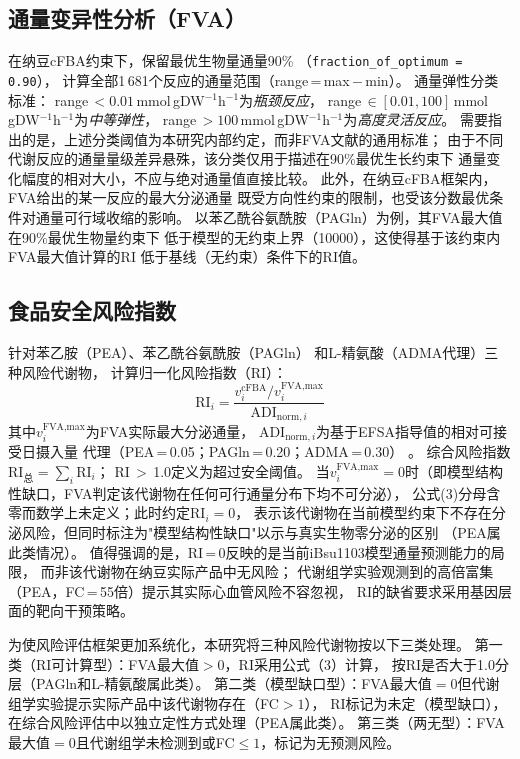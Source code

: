 \documentclass[10pt, a4paper, twocolumn]{ctexart}
\newcommand{\ibsu}{iBsu1103}
\newcommand{\cfba}{cFBA}
\newcommand{\mmolg}{mmol\,gDW$^{-1}$h$^{-1}$}
\begin{document}
\subsection{通量变异性分析（FVA）}

在纳豆\cfba{}约束下，保留最优生物量通量90\%
（\texttt{fraction\_of\_optimum\,=\,0.90}）\citep{Gudmundsson2010}，
计算全部1\,681个反应的通量范围（range\,=\,max\,$-$\,min）。
通量弹性分类标准：
range\,$<0.01$\,\mmolg{}为\emph{瓶颈反应}，
range\,$\in[0.01, 100]$\,\mmolg{}为\emph{中等弹性}，
range\,$>100$\,\mmolg{}为\emph{高度灵活反应}。
需要指出的是，上述分类阈值为本研究内部约定，而非FVA文献的通用标准；
由于不同代谢反应的通量量级差异悬殊，该分类仅用于描述在90\%最优生长约束下
通量变化幅度的相对大小，不应与绝对通量值直接比较。
此外，在纳豆\cfba{}框架内，FVA给出的某一反应的最大分泌通量
既受方向性约束的限制，也受该分数最优条件对通量可行域收缩的影响。
以苯乙酰谷氨酰胺（PAGln）为例，其FVA最大值在90\%最优生物量约束下
低于模型的无约束上界（10000），这使得基于该约束内FVA最大值计算的RI
低于基线（无约束）条件下的RI值。

\subsection{食品安全风险指数}

针对苯乙胺（PEA）、苯乙酰谷氨酰胺（PAGln）
和L-精氨酸（ADMA代理）三种风险代谢物，
计算归一化风险指数（RI）：
\begin{equation}
  \mathrm{RI}_i =
  \frac{v_i^{\text{cFBA}} / v_i^{\text{FVA,max}}}{\mathrm{ADI}_{\text{norm},i}}
\end{equation}
其中$v_i^{\text{FVA,max}}$为FVA实际最大分泌通量，
$\mathrm{ADI}_{\text{norm},i}$为基于EFSA指导值的相对可接受日摄入量
代理（PEA\,=\,0.05；PAGln\,=\,0.20；ADMA\,=\,0.30）
\citep{EFSA2011,Ladero2010}。
综合风险指数$\mathrm{RI}_{\text{总}}=\sum_i\mathrm{RI}_i$；
RI\,$>$\,1.0定义为超过安全阈值。
当$v_i^{\text{FVA,max}}=0$时（即模型结构性缺口，FVA判定该代谢物在任何可行通量分布下均不可分泌），
公式(3)分母含零而数学上未定义；此时约定$\mathrm{RI}_i=0$，
表示该代谢物在当前模型约束下不存在分泌风险，但同时标注为"模型结构性缺口"以示与真实生物零分泌的区别
（PEA属此类情况）。
值得强调的是，RI\,=\,0反映的是当前\ibsu{}模型通量预测能力的局限，
而非该代谢物在纳豆实际产品中无风险；
代谢组学实验观测到的高倍富集（PEA，FC\,=\,55倍）提示其实际心血管风险不容忽视，
RI的缺省要求采用基因层面的靶向干预策略。

为使风险评估框架更加系统化，本研究将三种风险代谢物按以下三类处理。
第一类（RI可计算型）：FVA最大值$>0$，RI采用公式（3）计算，
按RI是否大于1.0分层（PAGln和L-精氨酸属此类）。
第二类（模型缺口型）：FVA最大值$=0$但代谢组学实验提示实际产品中该代谢物存在（FC$>1$），
RI标记为未定（模型缺口），在综合风险评估中以独立定性方式处理（PEA属此类）。
第三类（两无型）：FVA最大值$=0$且代谢组学未检测到或FC$\leq1$，标记为无预测风险。
\end{document}
